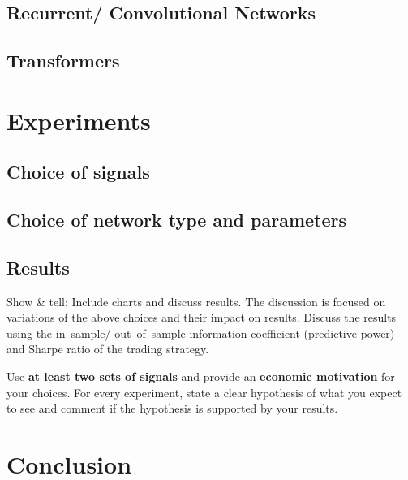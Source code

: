 \documentclass[conference]{IEEEtran}
\begin{document}
\subsection{Recurrent/ Convolutional Networks}

\vspace{5ex}

\subsection{Transformers}

\vspace{5ex}


\section{Experiments}





\subsection{Choice of signals}
\vspace{5ex}

\subsection{Choice of network type and parameters}
\vspace{5ex}

\subsection{Results}

Show \& tell: Include charts and discuss results. The discussion is focused on variations of the above choices and their impact on results. Discuss the results using the in--sample/ out--of--sample information coefficient (predictive power) and Sharpe ratio of the trading strategy.  

\noindent
Use \textbf{at least two sets of signals} and provide an \textbf{economic motivation}  for your choices. For every experiment, state a clear hypothesis of what you expect to see and comment if the hypothesis is supported by your results. 
\vspace{5ex}

\section{Conclusion}
\end{document}
